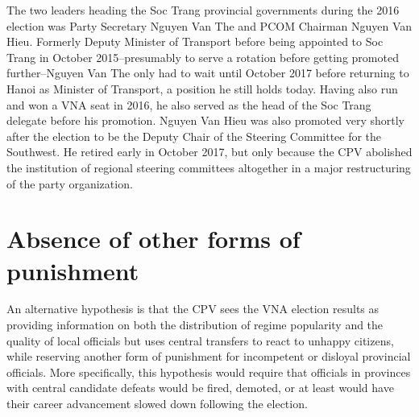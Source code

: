 \documentclass[12pt]{article}
\newcommand{\1}{\mathbbm{1}}
\begin{document}
The two leaders heading the Soc Trang provincial governments during the 2016 election was Party Secretary Nguyen Van The and PCOM Chairman Nguyen Van Hieu. Formerly Deputy Minister of Transport before being appointed to Soc Trang in October 2015--presumably to serve a rotation before getting promoted further--Nguyen Van The only had to wait until October 2017 before returning to Hanoi as Minister of Transport, a position he still holds today. Having also run and won a VNA seat in 2016, he also served as the head of the Soc Trang delegate before his promotion. Nguyen Van Hieu was also promoted very shortly after the election to be the Deputy Chair of the Steering Committee for the Southwest. He retired early in October 2017, but only because the CPV abolished the institution of regional steering committees altogether in a major restructuring of the party organization.


\clearpage
\section{Absence of other forms of punishment}
\label{app:punishment}

An alternative hypothesis is that the CPV sees the VNA election results as providing information on both the distribution of regime popularity and the quality of local officials but uses central transfers to react to unhappy citizens, while reserving another form of punishment for incompetent or disloyal provincial officials. More specifically, this hypothesis would require that officials in provinces with central candidate defeats would be fired, demoted, or at least would have their career advancement slowed down following the election.
\end{document}

